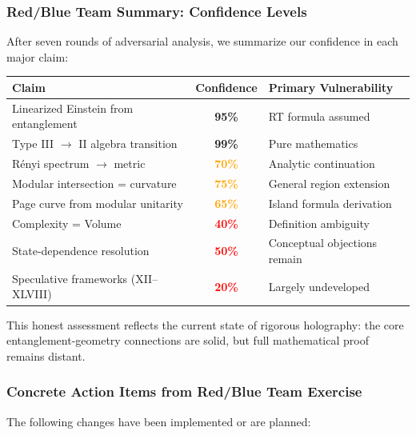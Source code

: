 \documentclass[12pt,a4paper]{article}
\begin{document}
\subsubsection{Red/Blue Team Summary: Confidence Levels}

After seven rounds of adversarial analysis, we summarize our confidence in each major claim:

\begin{center}
\small
\renewcommand{\arraystretch}{1.2}
\begin{tabular}{|p{5cm}|c|p{5.5cm}|}
\hline
\textbf{Claim} & \textbf{Confidence} & \textbf{Primary Vulnerability} \\
\hline
Linearized Einstein from entanglement & \textcolor{green!50!black}{\textbf{95\%}} & RT formula assumed \\
\hline
Type III $\to$ II algebra transition & \textcolor{green!50!black}{\textbf{99\%}} & Pure mathematics \\
\hline
R\'enyi spectrum $\to$ metric & \textcolor{orange}{\textbf{70\%}} & Analytic continuation \\
\hline
Modular intersection = curvature & \textcolor{orange}{\textbf{75\%}} & General region extension \\
\hline
Page curve from modular unitarity & \textcolor{orange}{\textbf{65\%}} & Island formula derivation \\
\hline
Complexity = Volume & \textcolor{red}{\textbf{40\%}} & Definition ambiguity \\
\hline
State-dependence resolution & \textcolor{red}{\textbf{50\%}} & Conceptual objections remain \\
\hline
Speculative frameworks (XII--XLVIII) & \textcolor{red}{\textbf{20\%}} & Largely undeveloped \\
\hline
\end{tabular}
\end{center}

This honest assessment reflects the current state of rigorous holography: the core entanglement-geometry connections are solid, but full mathematical proof remains distant.

\subsubsection{Concrete Action Items from Red/Blue Team Exercise}

The following changes have been implemented or are planned:
\end{document}
